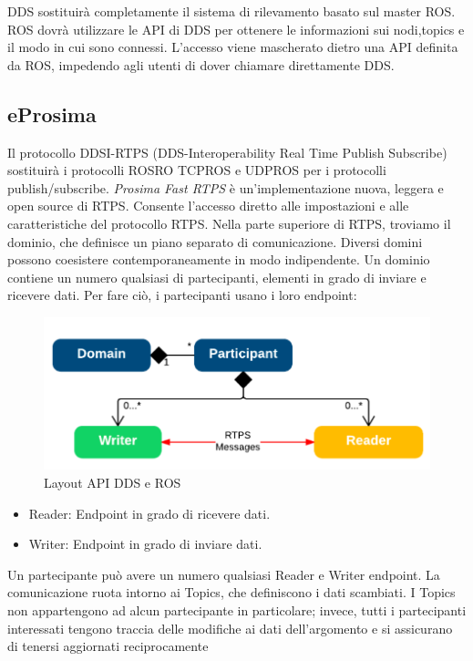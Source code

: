 \documentclass[a4paper]{article}
\begin{document}
DDS sostituirà completamente il sistema di rilevamento basato sul master ROS. ROS dovrà utilizzare le API di DDS per ottenere le informazioni sui nodi,topics e il modo in cui sono connessi. L'accesso viene mascherato dietro una API definita da ROS, impedendo agli utenti di dover chiamare direttamente DDS. 


\subsection{eProsima}
Il protocollo DDSI-RTPS (DDS-Interoperability Real Time Publish Subscribe) sostituirà i protocolli ROSRO TCPROS e UDPROS per i protocolli publish/subscribe.
\textit{Prosima Fast RTPS} è un'implementazione  nuova, leggera e open source di RTPS. Consente l'accesso diretto alle impostazioni e alle caratteristiche del protocollo RTPS.
Nella parte superiore di RTPS, troviamo il dominio, che definisce un piano separato di comunicazione. Diversi domini possono coesistere contemporaneamente in modo indipendente. Un dominio contiene un numero qualsiasi di partecipanti, elementi in grado di inviare e ricevere dati. Per fare ciò, i partecipanti usano i loro endpoint:

\begin{figure}[htbp]
\centering
\includegraphics[scale=0.5]{dds_img1.PNG} 
\caption{Layout API DDS e ROS}
\end{figure}

\begin{itemize}
\item Reader: Endpoint in grado di ricevere dati.

\item Writer: Endpoint in grado di inviare dati.
\end{itemize}

Un partecipante può avere un numero qualsiasi Reader e Writer endpoint.
La comunicazione ruota intorno ai Topics, che definiscono i dati scambiati. I Topics non appartengono ad alcun partecipante in particolare; invece, tutti i partecipanti interessati tengono traccia delle modifiche ai dati dell'argomento e si assicurano di tenersi aggiornati reciprocamente
\end{document}
